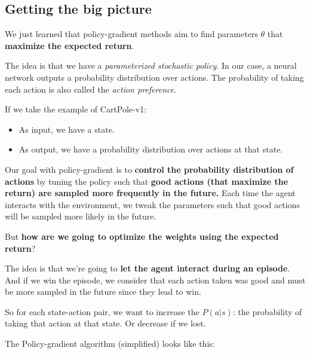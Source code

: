 \documentclass[11pt,a4paper]{article}
\begin{document}
\subsection{Getting the big picture}\label{getting-the-big-picture}

We just learned that policy-gradient methods aim to find parameters \(\theta\) that \textbf{maximize the expected return}.

The idea is that we have a \emph{parameterized stochastic policy}. In our case, a neural network outputs a probability distribution over actions. The probability of taking each action is also called the \emph{action preference}.

If we take the example of CartPole-v1:

\begin{itemize}
\tightlist
\item
  As input, we have a state.
\item
  As output, we have a probability distribution over actions at that state.
\end{itemize}


Our goal with policy-gradient is to \textbf{control the probability distribution of actions} by tuning the policy such that \textbf{good actions (that maximize the return) are sampled more frequently in the future.} Each time the agent interacts with the environment, we tweak the parameters such that good actions will be sampled more likely in the future.

But \textbf{how are we going to optimize the weights using the expected return}?

The idea is that we're going to \textbf{let the agent interact during an episode}. And if we win the episode, we consider that each action taken was good and must be more sampled in the future since they lead to win.

So for each state-action pair, we want to increase the \(P(a|s)\): the probability of taking that action at that state. Or decrease if we lost.

The Policy-gradient algorithm (simplified) looks like this:

\end{document}
